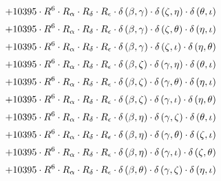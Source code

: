 \begin{subequations}
\begin{gather}
 \\[0.2em] \notag 		 + 10395 \cdot R^{6} \cdot R_{\alpha{}} \cdot R_{\delta{}} \cdot R_{\epsilon{}} \cdot \delta{}\left(\beta{}, \gamma{}\right) \cdot \delta{}\left(\zeta{}, \eta{}\right) \cdot \delta{}\left(\theta{}, \iota{}\right) 
 \\[0.2em] \notag 		 + 10395 \cdot R^{6} \cdot R_{\alpha{}} \cdot R_{\delta{}} \cdot R_{\epsilon{}} \cdot \delta{}\left(\beta{}, \gamma{}\right) \cdot \delta{}\left(\zeta{}, \theta{}\right) \cdot \delta{}\left(\eta{}, \iota{}\right) 
 \\[0.2em] \notag 		 + 10395 \cdot R^{6} \cdot R_{\alpha{}} \cdot R_{\delta{}} \cdot R_{\epsilon{}} \cdot \delta{}\left(\beta{}, \gamma{}\right) \cdot \delta{}\left(\zeta{}, \iota{}\right) \cdot \delta{}\left(\eta{}, \theta{}\right) 
 \\[0.2em] \notag 		 + 10395 \cdot R^{6} \cdot R_{\alpha{}} \cdot R_{\delta{}} \cdot R_{\epsilon{}} \cdot \delta{}\left(\beta{}, \zeta{}\right) \cdot \delta{}\left(\gamma{}, \eta{}\right) \cdot \delta{}\left(\theta{}, \iota{}\right) 
 \\[0.2em] \notag 		 + 10395 \cdot R^{6} \cdot R_{\alpha{}} \cdot R_{\delta{}} \cdot R_{\epsilon{}} \cdot \delta{}\left(\beta{}, \zeta{}\right) \cdot \delta{}\left(\gamma{}, \theta{}\right) \cdot \delta{}\left(\eta{}, \iota{}\right) 
 \\[0.2em] \notag 		 + 10395 \cdot R^{6} \cdot R_{\alpha{}} \cdot R_{\delta{}} \cdot R_{\epsilon{}} \cdot \delta{}\left(\beta{}, \zeta{}\right) \cdot \delta{}\left(\gamma{}, \iota{}\right) \cdot \delta{}\left(\eta{}, \theta{}\right) 
 \\[0.2em] \notag 		 + 10395 \cdot R^{6} \cdot R_{\alpha{}} \cdot R_{\delta{}} \cdot R_{\epsilon{}} \cdot \delta{}\left(\beta{}, \eta{}\right) \cdot \delta{}\left(\gamma{}, \zeta{}\right) \cdot \delta{}\left(\theta{}, \iota{}\right) 
 \\[0.2em] \notag 		 + 10395 \cdot R^{6} \cdot R_{\alpha{}} \cdot R_{\delta{}} \cdot R_{\epsilon{}} \cdot \delta{}\left(\beta{}, \eta{}\right) \cdot \delta{}\left(\gamma{}, \theta{}\right) \cdot \delta{}\left(\zeta{}, \iota{}\right) 
 \\[0.2em] \notag 		 + 10395 \cdot R^{6} \cdot R_{\alpha{}} \cdot R_{\delta{}} \cdot R_{\epsilon{}} \cdot \delta{}\left(\beta{}, \eta{}\right) \cdot \delta{}\left(\gamma{}, \iota{}\right) \cdot \delta{}\left(\zeta{}, \theta{}\right) 
 \\[0.2em] \notag 		 + 10395 \cdot R^{6} \cdot R_{\alpha{}} \cdot R_{\delta{}} \cdot R_{\epsilon{}} \cdot \delta{}\left(\beta{}, \theta{}\right) \cdot \delta{}\left(\gamma{}, \zeta{}\right) \cdot \delta{}\left(\eta{}, \iota{}\right) 

\end{gather}
\end{subequations}
